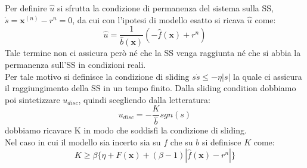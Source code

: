 Per definire $\hat{u}$ si sfrutta la condizione di permanenza del sistema sulla SS, \\$\dot{s}=\boldsymbol {x}^{(n)}-r^n=0$, da cui con l'ipotesi di modello esatto si ricava $\hat{u}$ come:
\begin{equation}
\hat{u}=\frac{1}{\hat{b}(\boldsymbol {x})}(-\hat{f}(\boldsymbol {x})+r^n)
\end{equation}
Tale termine non ci assicura però né che la SS venga raggiunta né che si abbia la permanenza sull'SS in condizioni reali.\\
Per tale motivo si definisce la condizione di sliding $s\dot{s}\leq -\eta|s|$ la quale ci assicura il raggiungimento della SS in un tempo finito. Dalla sliding condition dobbiamo poi sintetizzare $u_{disc}$, quindi scegliendo dalla letteratura:
\begin{equation}
u_{disc}=-\frac{K}{\hat{b}}sgn(s)
\end{equation}
dobbiamo ricavare K in modo che soddisfi la condizione di sliding.
\\
Nel caso in cui il modello sia incerto sia su $f$ che su $b$ si definisce $K$ come:
\begin{equation}
K\geq \beta \{\eta+F(\boldsymbol {x})+(\beta-1)|\hat{f}(\boldsymbol {x})-r^n|\}
\end{equation}
